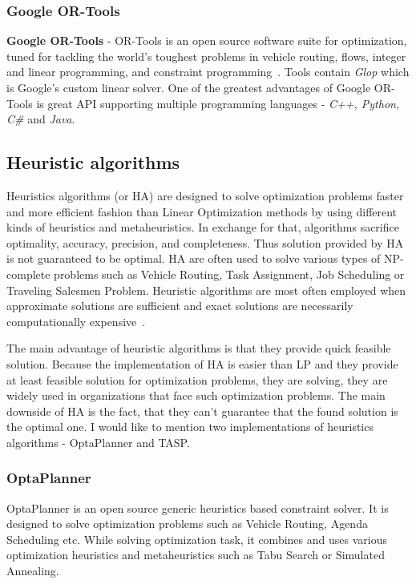 \subsubsection{Google OR-Tools}
\textbf{Google OR-Tools} - OR-Tools is an open source software suite for optimization,
tuned for tackling the world's toughest problems in vehicle routing, flows,
integer and linear programming, and constraint programming~\cite{web:googleOrTools}.
Tools contain \textit{Glop} which is Google's custom linear solver.
One of the greatest advantages of Google OR-Tools is great API supporting multiple programming languages - \textit{C++, Python, C\#} and \textit{Java}.


\subsection{Heuristic algorithms}\label{subsec:heuristic-algorithms}
Heuristics algorithms (or HA) are designed to solve optimization problems faster
and more efficient fashion than Linear Optimization methods by using different kinds of heuristics and metaheuristics.
In exchange for that, algorithms sacrifice optimality, accuracy, precision, and completeness.
Thus solution provided by HA is not guaranteed to be optimal.
HA are often used to solve various types of NP-complete problems such as
Vehicle Routing, Task Assignment, Job Scheduling or Traveling Salesmen Problem.
Heuristic algorithms are most often employed when approximate solutions are sufficient
and exact solutions are necessarily computationally expensive~\cite{papanikolaou2018holistic}.

The main advantage of heuristic algorithms is that they provide quick feasible solution.
Because the implementation of HA is easier than LP and they provide at least feasible solution for optimization problems,
they are solving, they are widely used in organizations that face such optimization problems.
The main downside of HA is the fact, that they can't guarantee that the found solution is the optimal one.\newline
I would like to mention two implementations of heuristics algorithms - OptaPlanner and TASP\@.

\subsubsection{OptaPlanner}
OptaPlanner is an open source generic heuristics based constraint solver.
It is designed to solve optimization problems such as Vehicle Routing, Agenda Scheduling etc.
While solving optimization task, it combines and uses various optimization heuristics and metaheuristics such as
Tabu Search or Simulated Annealing.

